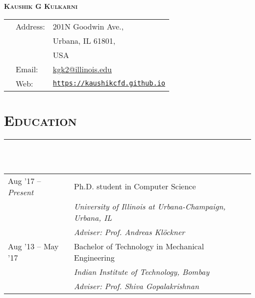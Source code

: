 \documentclass[letterpaper, 13pt]{article}
\begin{document}

\begin{center}
    \LARGE
    \textsc{\textbf{Kaushik G Kulkarni}}\\
    \vspace{1ex}
    \normalsize
    \begin{tabular}{p{}p{8ex} p{}}
        & Address:    & 201N Goodwin Ave.,\\
        &             & Urbana, IL 61801,\\
        &             & USA\\
        & Email:      &\href{mailto:kgk2@illinois.edu}{kgk2@illinois.edu}\\
        & Web:        & \texttt{\small \url{https://kaushikcfd.github.io}} \\
    \end{tabular}
\end{center}



\section*{\Large\textsc{Education}}
\vspace{-4ex}
\rule{\textwidth}{0.1ex}\\
\vspace{1ex}\\
\begin{tabular}{p{} p{}}
Aug '17 --  \textit{Present}  & Ph.D. student in Computer Science \\
                              & \textit{University of Illinois at Urbana-Champaign, Urbana, IL} \\
                              & \textit{Adviser: Prof. Andreas Kl\"{o}ckner}\vspace{1ex}\\
Aug '13 -- May '17            & Bachelor of Technology in Mechanical Engineering \\
                              & \textit{Indian Institute of Technology, Bombay} \\
                              & \textit{Adviser: Prof. Shiva Gopalakrishnan}
\end{tabular}


\end{document}
